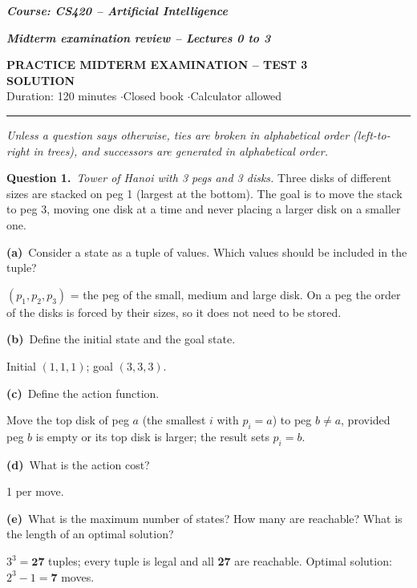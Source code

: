 \documentclass[11pt,a4paper]{article}
\newcommand{\question}[1]{\par\medskip\noindent\textbf{Question #1.}\ }
\newcommand{\subq}[1]{\par\smallskip\noindent\textbf{#1}\ }
\begin{document}
{\large\textbf{\textit{Course: CS420 -- Artificial Intelligence}}}\par
{\textbf{\textit{Midterm examination review -- Lectures 0 to 3}}}\par
\begin{center}{\Large\bfseries PRACTICE MIDTERM EXAMINATION -- TEST 3\\[2pt]\textcolor{blue!55!black}{SOLUTION}}\\[3pt]
{\small Duration: 120 minutes \quad$\cdot$\quad Closed book \quad$\cdot$\quad Calculator allowed}\end{center}
\noindent\rule{\linewidth}{0.6pt}

{\small\textit{Unless a question says otherwise, ties are broken in alphabetical order (left-to-right in trees), and successors are generated in alphabetical order.}}\par
\question{1}\textit{Tower of Hanoi with 3 pegs and 3 disks.} Three disks of different sizes are stacked on peg 1 (largest at the bottom). The goal is to move the stack to peg 3, moving one disk at a time and never placing a larger disk on a smaller one.
\subq{(a)}Consider a state as a tuple of values. Which values should be included in the tuple?
\begin{solbox}
$(p_1,p_2,p_3)$ = the peg of the small, medium and large disk. On a peg the order of the disks is forced by their sizes, so it does not need to be stored.
\end{solbox}
\subq{(b)}Define the initial state and the goal state.
\begin{solbox}
Initial $(1,1,1)$; goal $(3,3,3)$.
\end{solbox}
\subq{(c)}Define the action function.
\begin{solbox}
Move the top disk of peg $a$ (the smallest $i$ with $p_i=a$) to peg $b\neq a$, provided peg $b$ is empty or its top disk is larger; the result sets $p_i=b$.
\end{solbox}
\subq{(d)}What is the action cost?
\begin{solbox}
1 per move.
\end{solbox}
\subq{(e)}What is the maximum number of states? How many are reachable? What is the length of an optimal solution?
\begin{solbox}
$3^3=\mathbf{27}$ tuples; every tuple is legal and all \textbf{27} are reachable. Optimal solution: $2^3-1=\mathbf{7}$ moves.
\end{solbox}
\end{document}
